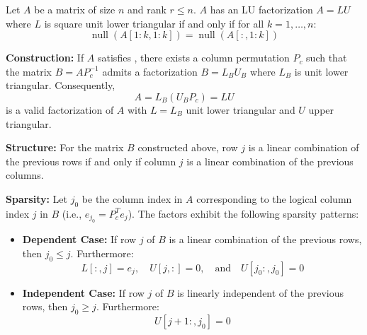 \documentclass[10pt,twoside]{siamart1116}
\DeclareMathOperator{\nl}{null}
\numberwithin{theorem}{section}
\begin{document}
\begin{theorem}\label{thm:main_unit_lower}
	Let $A$ be a matrix of size $n$ and rank $r \le n$. $A$ has an LU factorization $A = LU$ where $L$ is square unit lower triangular if and only if for all $k = 1, \ldots, n$:
	\begin{equation}
		\label{eq:cond_unit_lower}
		\nl(A[1:k,1:k]) = \nl(A[:,1:k])
	\end{equation}

	\noindent\textbf{Construction:} If $A$ satisfies , there exists a column permutation $P_c$ such that the matrix $B = A P_c^{-1}$ admits a factorization $B = L_B U_B$ where $L_B$ is unit lower triangular. Consequently,
	\[ A = L_B (U_B P_c) = L U \]
	is a valid factorization of $A$ with $L=L_B$ unit lower triangular and $U$ upper triangular.

	\noindent\textbf{Structure:} For the matrix $B$ constructed above, row $j$ is a linear combination of the previous rows if and only if column $j$ is a linear combination of the previous columns.

	\noindent\textbf{Sparsity:} Let $j_0$ be the column index in $A$ corresponding to the logical column index $j$ in $B$ (i.e., $e_{j_0} = P_c^T e_j$). The factors exhibit the following sparsity patterns:
	\begin{itemize}
		\item \textbf{Dependent Case:} If row $j$ of $B$ is a linear combination of the previous rows, then $j_0 \le j$. Furthermore:
		\[ L[:,j] = e_j, \quad U[j,:] = 0, \quad \text{and} \quad U[j_0:, j_0] = 0 \]
		\item \textbf{Independent Case:} If row $j$ of $B$ is linearly independent of the previous rows, then $j_0 \ge j$. Furthermore:
		\[ U[j+1:, j_0] = 0 \]
	\end{itemize}
\end{theorem}
\end{document}
